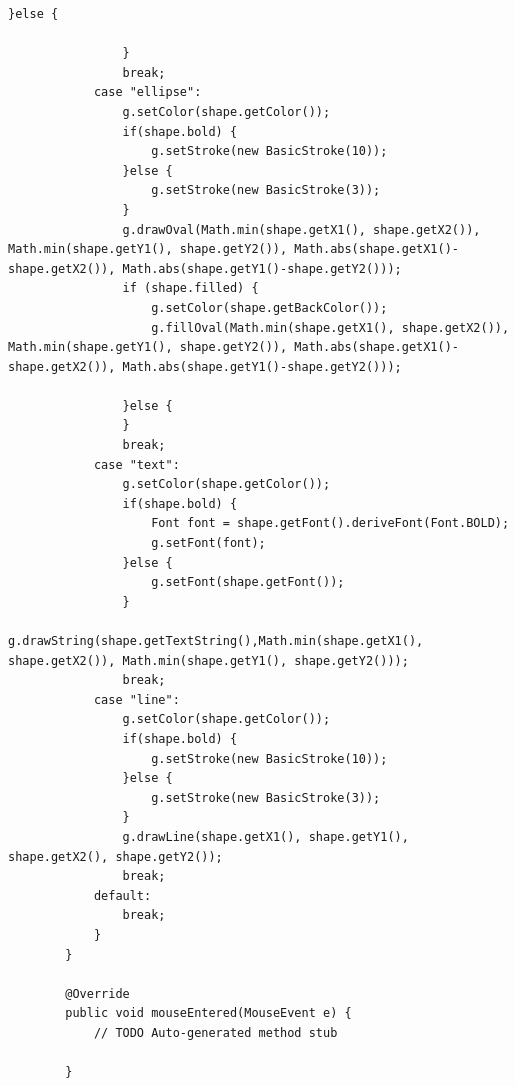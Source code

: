 \documentclass{ctexart}
\begin{document}
\begin{lstlisting}[caption = PaintPanel.java]
                }else {
    
                }
                break;
            case "ellipse":
                g.setColor(shape.getColor());
                if(shape.bold) {
                    g.setStroke(new BasicStroke(10));
                }else {
                    g.setStroke(new BasicStroke(3));
                }
                g.drawOval(Math.min(shape.getX1(), shape.getX2()), Math.min(shape.getY1(), shape.getY2()), Math.abs(shape.getX1()-shape.getX2()), Math.abs(shape.getY1()-shape.getY2()));
                if (shape.filled) {
                    g.setColor(shape.getBackColor());
                    g.fillOval(Math.min(shape.getX1(), shape.getX2()), Math.min(shape.getY1(), shape.getY2()), Math.abs(shape.getX1()-shape.getX2()), Math.abs(shape.getY1()-shape.getY2()));
    
                }else {
                }
                break;			
            case "text":
                g.setColor(shape.getColor());
                if(shape.bold) {
                    Font font = shape.getFont().deriveFont(Font.BOLD);
                    g.setFont(font);
                }else {
                    g.setFont(shape.getFont());
                }
                g.drawString(shape.getTextString(),Math.min(shape.getX1(), shape.getX2()), Math.min(shape.getY1(), shape.getY2()));
                break;
            case "line":
                g.setColor(shape.getColor());
                if(shape.bold) {
                    g.setStroke(new BasicStroke(10));
                }else {
                    g.setStroke(new BasicStroke(3));
                }
                g.drawLine(shape.getX1(), shape.getY1(), shape.getX2(), shape.getY2());
                break;
            default:
                break;
            }
        }
    
        @Override
        public void mouseEntered(MouseEvent e) {
            // TODO Auto-generated method stub
            
        }
    

\end{lstlisting}
\end{document}
